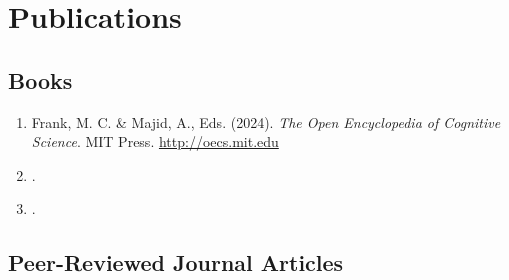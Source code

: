 \documentclass{article}
\begin{document}
\section*{Publications}
\subsection*{Books}

\begin{enumerate}

  \item Frank, M. C. \& Majid, A., Eds. (2024). {\it The Open Encyclopedia of Cognitive Science}. MIT Press. \url{http://oecs.mit.edu}

  \item {}.

  \item {}.

\end{enumerate}


\subsection*{Peer-Reviewed Journal Articles}
\end{document}
